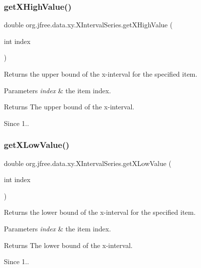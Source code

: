 \subsubsection{\texorpdfstring{get\+X\+High\+Value()}{getXHighValue()}}
{\footnotesize\ttfamily double org.\+jfree.\+data.\+xy.\+X\+Interval\+Series.\+get\+X\+High\+Value (\begin{DoxyParamCaption}\item[{int}]{index }\end{DoxyParamCaption})}

Returns the upper bound of the x-\/interval for the specified item.


\begin{DoxyParams}{Parameters}
{\em index} & the item index.\\
\hline
\end{DoxyParams}
\begin{DoxyReturn}{Returns}
The upper bound of the x-\/interval.
\end{DoxyReturn}
\begin{DoxySince}{Since}
1.. 
\end{DoxySince}
\mbox{\label{classorg_1_1jfree_1_1data_1_1xy_1_1_x_interval_series_a61bbfd5c788186e1f6eebb71308a4e67}} 
\subsubsection{\texorpdfstring{get\+X\+Low\+Value()}{getXLowValue()}}
{\footnotesize\ttfamily double org.\+jfree.\+data.\+xy.\+X\+Interval\+Series.\+get\+X\+Low\+Value (\begin{DoxyParamCaption}\item[{int}]{index }\end{DoxyParamCaption})}

Returns the lower bound of the x-\/interval for the specified item.


\begin{DoxyParams}{Parameters}
{\em index} & the item index.\\
\hline
\end{DoxyParams}
\begin{DoxyReturn}{Returns}
The lower bound of the x-\/interval.
\end{DoxyReturn}
\begin{DoxySince}{Since}
1.. 
\end{DoxySince}
\mbox{\label{classorg_1_1jfree_1_1data_1_1xy_1_1_x_interval_series_adc6aea4f89528bf3e77c637fb95b5d01}} 
